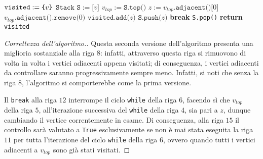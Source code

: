 \documentclass[a4paper, 12pt]{report}
\begin{document}
    \begin{algorithm}[H]
        \caption{
            Seconda versione dell'algoritmo; dato un grafo $G$, diretto o indiretto, rappresentato attraverso liste di adiacenza, e un suo vertice $v$, l'algoritmo restituisce tutti i vertici, raggiungibili attraverso cammini, partendo da $v$.\\
            \textbf{Input}: $G$ un grafo, rappresentato attraverso liste di adiacenza; $v$ un vertice di $G$.\\
            \textbf{Output}: i vertici raggiungibili da $v$.
        }

        \begin{algorithmic}[1]
            \label{findReachableNodes2}
                \State $\texttt{visited} := \verb|{|v\verb|}|$
                \State $\texttt{Stack S} := \texttt{[}v\texttt{]}$
                    \State $v_{top}:=\texttt{S.top()}$
                        \State $z := v_{top}\texttt{.adjacent()[}0\texttt{]}$
                        \State $v_{top}\texttt{.adjacent().remove(}0\texttt{)}$ 
                            \State $\texttt{visited.add(}z\texttt{)}$
                            \State $\texttt{S.push(}z\texttt{)}$
                            \State \textbf{break}
                        \EndIf
                    \EndWhile
                        \State \texttt{S.pop()}
                    \EndIf
                \EndWhile
                \State \textbf{return} \texttt{visited}
            \EndFunction
        \end{algorithmic}
    \end{algorithm}

    \begin{proof}[Correttezza dell'algoritmo.]
        Questa seconda versione dell'algoritmo presenta una miglioria sostanziale alla riga $8$: infatti, attraverso questa riga si rimuovono di volta in volta i vertici adiacenti appena visitati; di conseguenza, i vertici adiacenti da controllare saranno progressivamente sempre meno. Infatti, si noti che senza la riga $8$, l'algoritmo si comporterebbe come la prima versione.

        Il \texttt{break} alla riga $12$ interrompe il ciclo \texttt{while} della riga $6$, facendo sì che $v_{top}$ della riga $5$, all'iterazione successiva del \texttt{while} della riga $4$, sia pari a $z$, dunque cambiando il vertice correntemente in esame. Di conseguenza, alla riga $15$ il controllo sarà valutato a \texttt{True} esclusivamente se non è mai stata eseguita la riga $11$ per tutta l'iterazione del ciclo \texttt{while} della riga $6$, ovvero quando tutti i vertici adiacenti a $v_{top}$ sono già stati visitati.
    \end{proof}
\end{document}
